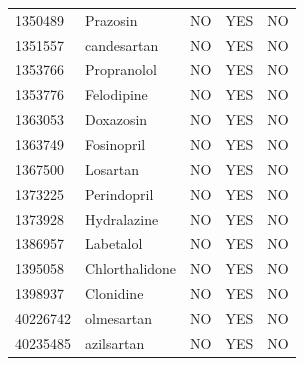 \documentclass[]{book}
\begin{document}
\begin{longtable}[]{@{}lllll@{}}
1350489 & Prazosin & NO & YES & NO\tabularnewline
1351557 & candesartan & NO & YES & NO\tabularnewline
1353766 & Propranolol & NO & YES & NO\tabularnewline
1353776 & Felodipine & NO & YES & NO\tabularnewline
1363053 & Doxazosin & NO & YES & NO\tabularnewline
1363749 & Fosinopril & NO & YES & NO\tabularnewline
1367500 & Losartan & NO & YES & NO\tabularnewline
1373225 & Perindopril & NO & YES & NO\tabularnewline
1373928 & Hydralazine & NO & YES & NO\tabularnewline
1386957 & Labetalol & NO & YES & NO\tabularnewline
1395058 & Chlorthalidone & NO & YES & NO\tabularnewline
1398937 & Clonidine & NO & YES & NO\tabularnewline
40226742 & olmesartan & NO & YES & NO\tabularnewline
40235485 & azilsartan & NO & YES & NO\tabularnewline
\bottomrule
\end{longtable}


\end{document}
